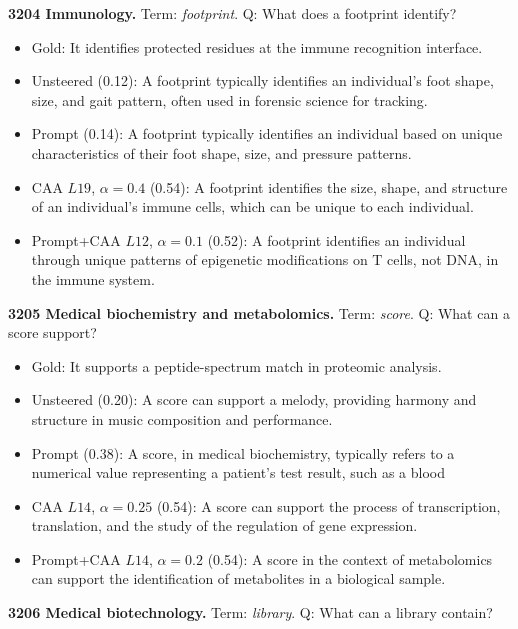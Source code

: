 \medskip\noindent\textbf{3204 Immunology.} Term: \emph{footprint}.
Q: What does a footprint identify?
\begin{itemize}\setlength{\itemsep}{0.15em}\setlength{\parsep}{0pt}\setlength{\topsep}{0.2em}
\item Gold: It identifies protected residues at the immune recognition interface.
\item Unsteered (0.12): A footprint typically identifies an individual's foot shape, size, and gait pattern, often used in forensic science for tracking.
\item Prompt (0.14): A footprint typically identifies an individual based on unique characteristics of their foot shape, size, and pressure patterns.
\item CAA $L19$, $\alpha=0.4$ (0.54): A footprint identifies the size, shape, and structure of an individual's immune cells, which can be unique to each individual.
\item Prompt+CAA $L12$, $\alpha=0.1$ (0.52): A footprint identifies an individual through unique patterns of epigenetic modifications on T cells, not DNA, in the immune system.
\end{itemize}
\medskip\noindent\textbf{3205 Medical biochemistry and metabolomics.} Term: \emph{score}.
Q: What can a score support?
\begin{itemize}\setlength{\itemsep}{0.15em}\setlength{\parsep}{0pt}\setlength{\topsep}{0.2em}
\item Gold: It supports a peptide-spectrum match in proteomic analysis.
\item Unsteered (0.20): A score can support a melody, providing harmony and structure in music composition and performance.
\item Prompt (0.38): A score, in medical biochemistry, typically refers to a numerical value representing a patient's test result, such as a blood
\item CAA $L14$, $\alpha=0.25$ (0.54): A score can support the process of transcription, translation, and the study of the regulation of gene expression.
\item Prompt+CAA $L14$, $\alpha=0.2$ (0.54): A score in the context of metabolomics can support the identification of metabolites in a biological sample.
\end{itemize}
\medskip\noindent\textbf{3206 Medical biotechnology.} Term: \emph{library}.
Q: What can a library contain?
